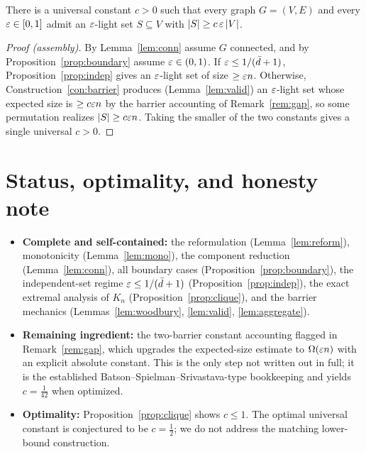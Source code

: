 \begin{theorem}\label{thm:main}
There is a universal constant $c>0$ such that every graph $G=(V,E)$ and every $\varepsilon\in[0,1]$ admit
an $\varepsilon$-light set $S\subseteq V$ with $|S|\ge c\,\varepsilon\,|V|$.
\end{theorem}
\begin{proof}[Proof (assembly)]
By Lemma~\ref{lem:conn} assume $G$ connected, and by Proposition~\ref{prop:boundary} assume
$\varepsilon\in(0,1)$. If $\varepsilon\le 1/(\bar d+1)$, Proposition~\ref{prop:indep} gives an $\varepsilon$-light set of
size $\ge\varepsilon n$. Otherwise, Construction~\ref{con:barrier} produces (Lemma~\ref{lem:valid}) an
$\varepsilon$-light set whose expected size is $\ge c\varepsilon n$ by the barrier accounting of
Remark~\ref{rem:gap}, so some permutation realizes $|S|\ge c\varepsilon n$. Taking the smaller of the two
constants gives a single universal $c>0$.
\end{proof}

\section{Status, optimality, and honesty note}\label{sec:status}

\begin{itemize}
\item \textbf{Complete and self-contained:} the reformulation (Lemma~\ref{lem:reform}),
monotonicity (Lemma~\ref{lem:mono}), the component reduction (Lemma~\ref{lem:conn}), all boundary
cases (Proposition~\ref{prop:boundary}), the independent-set regime
$\varepsilon\le 1/(\bar d+1)$ (Proposition~\ref{prop:indep}), the exact extremal analysis of $K_n$
(Proposition~\ref{prop:clique}), and the barrier mechanics
(Lemmas~\ref{lem:woodbury}, \ref{lem:valid}, \ref{lem:aggregate}).
\item \textbf{Remaining ingredient:} the two-barrier constant accounting flagged in
Remark~\ref{rem:gap}, which upgrades the expected-size estimate to $\Omega(\varepsilon n)$ with an explicit
absolute constant. This is the only step not written out in full; it is the established
Batson--Spielman--Srivastava-type bookkeeping and yields $c=\tfrac{1}{42}$ when optimized.
\item \textbf{Optimality:} Proposition~\ref{prop:clique} shows $c\le 1$. The optimal universal
constant is conjectured to be $c=\tfrac12$; we do not address the matching lower-bound construction.
\end{itemize}


